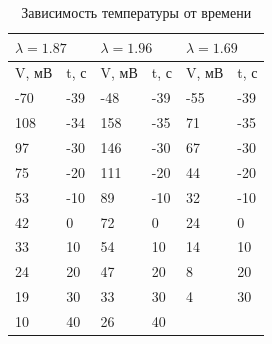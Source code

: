\documentclass[a4paper,12pt]{article} %
\begin{document}
\begin{table}[h!]
\caption{Зависимость температуры от времени}
\label{slow_tab}
\begin{tabular}{|ll||ll||ll|}
\hline
\multicolumn{2}{|l|}{$\lambda = 1.87$} & \multicolumn{2}{l|}{$\lambda = 1.96$} & \multicolumn{2}{l|}{$\lambda = 1.69$} \\ \hline
\multicolumn{1}{|l|}{V, мВ}   & t, с   & \multicolumn{1}{l|}{V, мВ}   & t, с   & \multicolumn{1}{l|}{V, мВ}   & t, с   \\ \hline
\multicolumn{1}{|l|}{-70}     & -39    & \multicolumn{1}{l|}{-48}     & -39    & \multicolumn{1}{l|}{-55}     & -39    \\ \hline
\multicolumn{1}{|l|}{108}     & -34    & \multicolumn{1}{l|}{158}     & -35    & \multicolumn{1}{l|}{71}      & -35    \\ \hline
\multicolumn{1}{|l|}{97}      & -30    & \multicolumn{1}{l|}{146}     & -30    & \multicolumn{1}{l|}{67}      & -30    \\ \hline
\multicolumn{1}{|l|}{75}      & -20    & \multicolumn{1}{l|}{111}     & -20    & \multicolumn{1}{l|}{44}      & -20    \\ \hline
\multicolumn{1}{|l|}{53}      & -10    & \multicolumn{1}{l|}{89}      & -10    & \multicolumn{1}{l|}{32}      & -10    \\ \hline
\multicolumn{1}{|l|}{42}      & 0      & \multicolumn{1}{l|}{72}      & 0      & \multicolumn{1}{l|}{24}      & 0      \\ \hline
\multicolumn{1}{|l|}{33}      & 10     & \multicolumn{1}{l|}{54}      & 10     & \multicolumn{1}{l|}{14}      & 10     \\ \hline
\multicolumn{1}{|l|}{24}      & 20     & \multicolumn{1}{l|}{47}      & 20     & \multicolumn{1}{l|}{8}       & 20     \\ \hline
\multicolumn{1}{|l|}{19}      & 30     & \multicolumn{1}{l|}{33}      & 30     & \multicolumn{1}{l|}{4}       & 30     \\ \hline
\multicolumn{1}{|l|}{10}      & 40     & \multicolumn{1}{l|}{26}      & 40     & \multicolumn{1}{l|}{}        &        \\ \hline
\end{tabular}
\end{table}
\end{document}
